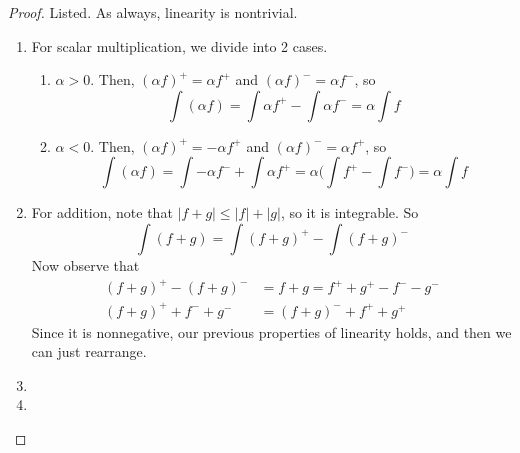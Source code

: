   \begin{proof}
    Listed. As always, linearity is nontrivial. 
    \begin{enumerate}
      \item For scalar multiplication, we divide into 2 cases. 
        \begin{enumerate}
          \item $\alpha > 0$. Then, $(\alpha f)^+ = \alpha f^+$ and $(\alpha f)^- = \alpha f^-$, so 
            \begin{equation}
              \int (\alpha f) = \int \alpha f^+ - \int \alpha f^- = \alpha \int f
            \end{equation}

          \item $\alpha < 0$. Then, $(\alpha f)^+ = - \alpha f^+$ and $(\alpha f)^- = \alpha f^+$, so 
            \begin{equation}
              \int (\alpha f) = \int -\alpha f^- + \int \alpha f^+ = \alpha \bigg( \int f^+ - \int f^- \bigg) = \alpha \int f
            \end{equation}
        \end{enumerate}
      \item For addition, note that $|f + g| \leq |f| + |g|$, so it is integrable. So 
        \begin{equation}
          \int (f + g) = \int (f + g)^+ - \int (f + g)^- 
        \end{equation}
        Now observe that 
        \begin{align}
          (f + g)^+ - (f + g)^- & = f + g = f^+ + g^+ - f^- - g^- \\ 
          (f + g)^+ + f^- + g^- & = (f + g)^- + f^+ + g^+ 
        \end{align}
        Since it is nonnegative, our previous properties of linearity holds, and then we can just rearrange. 
      \item 
      \item 
    \end{enumerate}
  \end{proof}

